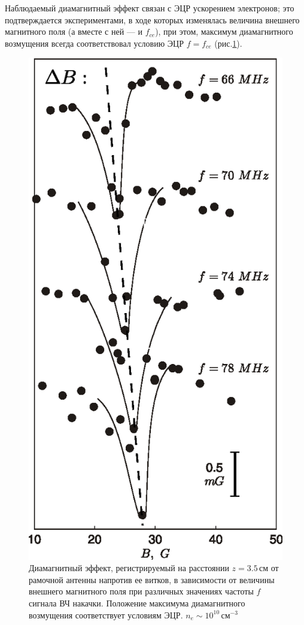 \documentclass[autoref,10pt]{disser}
\begin{document}
Наблюдаемый диамагнитный эффект связан с ЭЦР ускорением электронов; это подтверждается экспериментами, в ходе которых изменялась величина внешнего магнитного поля (а вместе с ней --- и $f_{ce}$), при этом,  максимум диамагнитного возмущения всегда соответствовал условию ЭЦР $f=f_{ce}$ (\mbox{рис.\ref{fig:ecr_combine}}).
\begin{figure}[H]
    \centering
    \includegraphics*[width=0.5\columnwidth]{pics/ecr_combine.eps}
    \caption{Диамагнитный эффект, регистрируемый на расстоянии $z=3.5$\,см от рамочной антенны напротив ее витков, в зависимости от величины внешнего магнитного поля при различных значениях частоты $f$ сигнала ВЧ накачки. Положение максимума диамагнитного возмущения соответствует условиям ЭЦР.  $n_{e}\sim{}10^{10}$\,см$^{-3}$}
    \label{fig:ecr_combine}
\end{figure}
\end{document}
